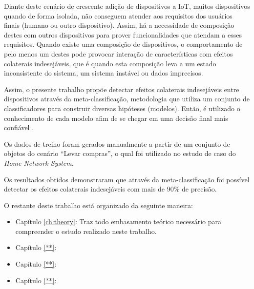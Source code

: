 Diante deste cenário de crescente adição de dispositivos a IoT, muitos dispositivos quando de forma isolada, não conseguem atender aos requisitos dos usuários finais (humano ou outro dispositivo). Assim, há a necessidade de composição destes com outros dispositivos para prover funcionalidades que atendam a esses requisitos. Quando existe uma composição de dispositivos, o comportamento de pelo menos um destes pode provocar interação de características com efeitos colaterais indesejáveis, que é quando esta composição leva a um estado inconsistente do sistema, um sistema instável ou dados imprecisos. 

Assim, o presente trabalho propõe detectar efeitos colaterais indesejáveis entre dispositivos através da meta-classificação, metodologia que utiliza um conjunto de classificadores para construir diversas hipóteses (modelos). Então, é utilizado o conhecimento de cada modelo afim de se chegar em uma decisão final mais confiável \cite{Melville:2004}.

Os dados de treino foram gerados manualmente a partir de um conjunto de objetos do cenário ``Levar compras'', o qual foi utilizado no estudo de caso do \textit{Home Network System}.

Os resultados obtidos demonstraram que através da meta-classificação foi possível detectar os efeitos colaterais indesejáveis com mais de 90\% de precisão.

O restante deste trabalho está organizado da seguinte maneira:

\begin{itemize}
\item Capítulo \ref{ch:theory}: Traz todo embasamento teórico necessário para compreender o estudo realizado neste trabalho.
\item Capítulo \ref{**}:  
\item Capítulo \ref{**}: 
\item Capítulo \ref{**}:
\end{itemize}
